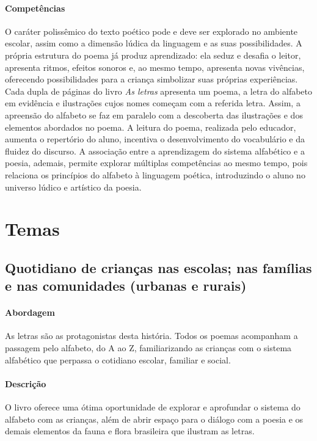 \documentclass[11pt]{extarticle}
\begin{document}
\paragraph{Competências} 
O caráter polissêmico do texto poético pode e deve ser explorado no ambiente escolar, assim como a dimensão lúdica da linguagem e as suas possibilidades. A própria estrutura do poema já produz aprendizado: ela seduz e desafia o leitor, apresenta ritmos, efeitos sonoros e, ao mesmo tempo, apresenta novas vivências, oferecendo possibilidades para a criança simbolizar suas próprias experiências. Cada dupla de páginas do livro \textit{As letras} apresenta um poema, a letra do alfabeto em evidência e ilustrações cujos nomes começam com a referida letra. Assim, a apreensão do alfabeto se faz em paralelo com a descoberta das ilustrações e dos elementos abordados no poema. A leitura do poema, realizada pelo educador, aumenta o repertório do aluno, incentiva o desenvolvimento do vocabulário e da fluidez do discurso.
A associação entre a aprendizagem do sistema alfabético e a poesia, ademais, permite explorar múltiplas competências ao mesmo tempo, pois relaciona os princípios do alfabeto à linguagem poética, introduzindo o aluno no universo lúdico e artístico da poesia.



\section{Temas}

\subsection{Quotidiano de crianças nas escolas; nas famílias e nas comunidades (urbanas e rurais)}

\paragraph{Abordagem} As letras são as protagonistas desta história. 
Todos os poemas acompanham a passagem pelo alfabeto, do A ao Z, familiarizando as crianças com o sistema alfabético que perpassa o cotidiano escolar, familiar e social.

\paragraph{Descrição} O livro oferece uma ótima oportunidade de explorar 
e aprofundar o sistema do alfabeto com as crianças, além de abrir espaço para o diálogo com a poesia e os demais elementos da fauna e flora brasileira que ilustram as letras.
\end{document}
